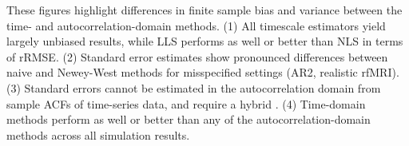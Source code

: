 \documentclass[latex/main.tex]{subfiles}
\begin{document}
These figures highlight differences in finite sample bias and variance between the time- and autocorrelation-domain methods. (1) All timescale estimators yield largely unbiased results, while LLS performs as well or better than NLS in terms of rRMSE. (2) Standard error estimates show pronounced differences between naive and Newey-West methods for misspecified settings (AR2, realistic rfMRI). (3) Standard errors cannot be estimated in the autocorrelation domain from sample ACFs of time-series data, and require a hybrid . (4) Time-domain methods perform as well or better than any of the autocorrelation-domain methods across all simulation results.
\end{document}
